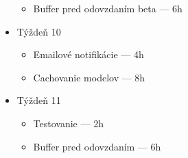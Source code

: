 \documentclass[a4paper]{article}
\begin{document}
\begin{itemize}
\begin{itemize}
        \item Buffer pred odovzdaním beta --- 6h
    \end{itemize}
    \item Týždeň 10
    \begin{itemize}
        \item Emailové notifikácie --- 4h
        \item Cachovanie modelov --- 8h
    \end{itemize}
    \item Týždeň 11
    \begin{itemize}
        \item Testovanie --- 2h
        \item Buffer pred odovzdaním --- 6h
    \end{itemize}

\end{itemize}
\end{document}
